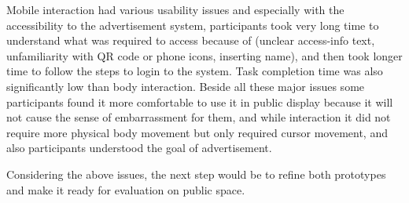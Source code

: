 Mobile interaction had various usability issues and especially with the accessibility to the advertisement system, participants took very long time to understand what was required to access because of (unclear access-info text, unfamiliarity with QR code or phone icons, inserting name), and then took longer time to follow the steps to login to the system. Task completion time was also significantly low than body interaction.  Beside all these major issues some participants found it more comfortable to use it in public display because it will not cause the sense of embarrassment for them, and while interaction it did not require more physical body movement but only required cursor movement, and also participants understood the goal of advertisement.

Considering the above issues, the next step would be to refine both prototypes and make it ready for evaluation on public space.














